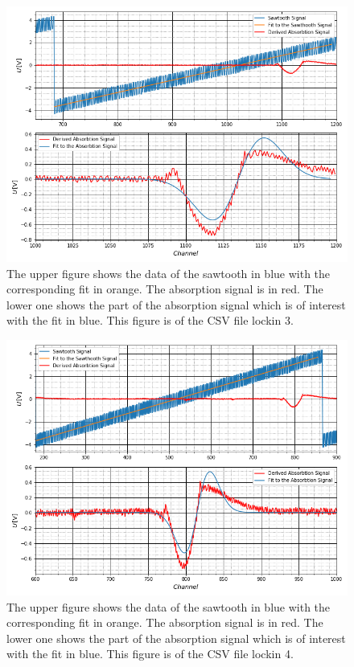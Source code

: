 	\begin{figure}[h]
		\includegraphics[scale=0.5]{Bild/LockIn3.png}
		\centering
		\caption[Plots and Fits of Lock-In Method 3]{\small The upper figure shows the data of the sawtooth in blue with the corresponding fit in orange. The absorption signal is in red. The lower one shows the part of the absorption signal which is of interest with the fit in blue. This figure is of the CSV file lockin 3.}
		\label{Lock3}
	\end{figure}
	\begin{figure}[h]
		\includegraphics[scale=0.5]{Bild/LockIn4.png}
		\centering
		\caption[Plots and Fits of Lock-In Method 4]{\small The upper figure shows the data of the sawtooth in blue with the corresponding fit in orange. The absorption signal is in red. The lower one shows the part of the absorption signal which is of interest with the fit in blue. This figure is of the CSV file lockin 4.}
		\label{Lock4}
	\end{figure}
